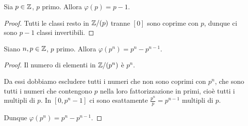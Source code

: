 \begin{proposition}
    Sia $p \in \mathbb{Z}$, $p$ primo. Allora $\varphi(p) = p - 1$. 
\end{proposition}
\begin{proof}
    Tutti le classi resto in $\mathbb{Z}/(p)$ tranne $[0]$ sono coprime con $p$, dunque ci sono $p-1$ classi invertibili.
\end{proof}

\begin{proposition}
    Siano $n, p \in \mathbb{Z}$, $p$ primo. Allora $\varphi(p^n) = p^n - p^{n-1}$. 
\end{proposition}
\begin{proof}
    Il numero di elementi in $\mathbb{Z}/(p^n)$ è $p^n$. 
    
    Da essi dobbiamo escludere tutti i numeri che non sono coprimi con $p^n$, che sono tutti i numeri che contengono $p$ nella loro fattorizzazione in primi, cioè tutti i multipli di $p$.
    In $[0, p^n - 1]$ ci sono esattamente $\frac{p^n}{p} = p^{n-1}$ multipli di $p$.

    Dunque $\varphi(p^n) = p^n - p^{n-1}$.
\end{proof}

